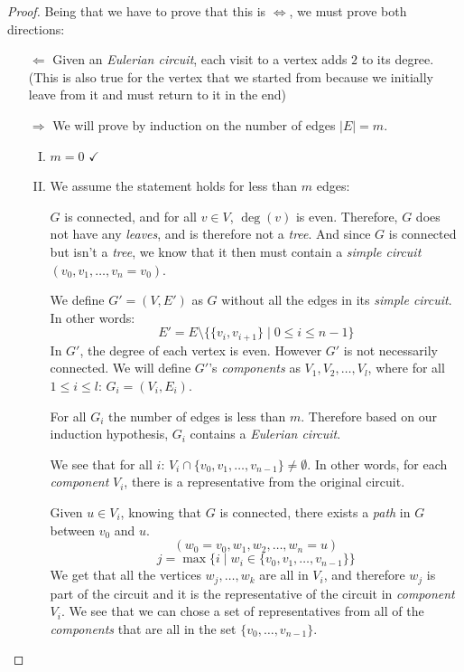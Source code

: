 \documentclass[00_complete]{subfiles}
\begin{document}
\begin{proof}
    Being that we have to prove that this is $\iff$, we must prove both directions:
    \begin{enumerate}
        \item[$\Leftarrow$] Given an \emph{Eulerian circuit}, each visit to a
            vertex adds $2$ to its degree. (This is also true for the vertex
            that we started from because we initially leave from it and must
            return to it in the end)

        \item[$\Rightarrow$] We will prove by induction on the number of edges
            $|E|=m$.
            \begin{enumerate}[I.]
               \item $m=0$ $\checkmark$
               \item We assume the statement holds for less than $m$ edges:

            $G$ is connected, and for all $v \in V$, $\deg(v)$
            is even. Therefore, $G$ does not have any \emph{leaves}, and is
            therefore not a \emph{tree}. And since $G$ is connected but isn't a
            \emph{tree}, we know that it then must contain a \emph{simple
            circuit} $(v_0,v_1,\dots,v_n=v_0)$.

            We define $G'=(V,E')$ as $G$ without all the edges in its
            \emph{simple circuit}. In other words:
            $$E'=E \setminus \{\{v_i,v_{i+1}\} \mid 0 \leq i \leq n-1\}$$
            In $G'$, the degree of each vertex is even. However $G'$ is not
            necessarily connected. We will define $G'$'s \emph{components} as
            $V_1,V_2,\dots,V_l$, where for all $1 \leq i \leq l$: $G_i=(V_i,E_i)$.

            For all $G_i$ the number of edges is less than $m$. Therefore based
            on our induction hypothesis, $G_i$ contains a \emph{Eulerian
            circuit}.

            We see that for all $i$: $V_i\cap\{v_0,v_1,\dots,v_{n-1}\}\neq
            \emptyset$. In other words, for each \emph{component} $V_i$, there
            is a representative from the original circuit.

            Given $u \in V_i$, knowing that $G$ is connected, there exists a
            \emph{path} in $G$ between $v_0$ and $u$.
            $$(w_0=v_0,w_1,w_2,\dots,w_n=u)$$
            $$j=\max\{i\mid w_i \in \{v_0,v_1,\dots,v_{n-1}\}\}$$
            We get that all the vertices $w_j,\dots,w_k$ are all in $V_i$, and
            therefore $w_j$ is part of the circuit and it is the representative
            of the circuit in \emph{component} $V_i$.
            We see that we can chose a set of representatives from all of the
            \emph{components} that are all in the set $\{v_0,\dots,v_{n-1}\}$.


\end{enumerate}
\end{enumerate}
\end{proof}
\end{document}
